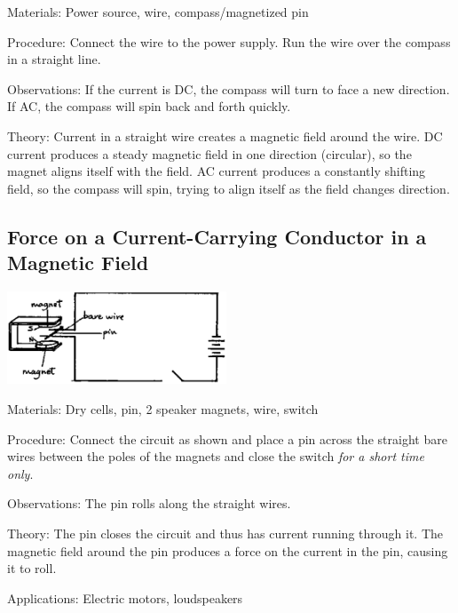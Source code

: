 \begin{multicols}{2}
\begin{description*}
\item[Materials:]{Power source, wire, compass/magnetized pin}
\item[Procedure:]{Connect the wire to the power supply. Run the wire over the compass in a straight line.}
\item[Observations:]{If the current is DC, the compass will turn to face a new direction. If AC, the compass will spin back and forth quickly.}
\item[Theory:]{Current in a straight wire creates a magnetic field around the wire. DC current produces a steady magnetic field in one direction (circular), so the magnet aligns itself with the field. AC current produces a constantly shifting field, so the compass will spin, trying to align itself as the field changes direction.}
\end{description*}

\subsection{Force on a Current-Carrying Conductor in a Magnetic Field}

\begin{center}
\includegraphics[width=0.49\textwidth]{./img/source/force-wire.png}
\end{center}

\begin{description*}
\item[Materials:]{Dry cells, pin, 2 speaker magnets, wire, switch}
\item[Procedure:]{Connect the circuit as shown and place a pin across the straight bare wires between the poles of the magnets and close the switch \emph{for a short time only}.}
\item[Observations:]{The pin rolls along the straight wires.}
\item[Theory:]{The pin closes the circuit and thus has current running through it. The magnetic field around the pin produces a force on the current in the pin, causing it to roll.}
\item[Applications:]{Electric motors, loudspeakers}
\end{description*}


\end{multicols}
